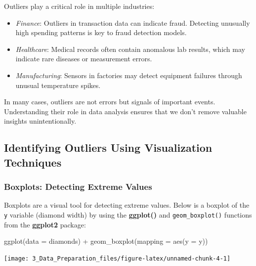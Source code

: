 \documentclass[
  11pt,
]{book}
\makeatletter
\newenvironment{Shaded}{}{}
\newcommand{\AttributeTok}[1]{#1}
\newcommand{\FunctionTok}[1]{#1}
\newcommand{\NormalTok}[1]{#1}
\newcommand{\SpecialCharTok}[1]{\textcolor[rgb]{0.39,0.39,0.39}{#1}}
\providecommand{\tightlist}{%
  \setlength{\itemsep}{0pt}\setlength{\parskip}{0pt}}
\newenvironment{kframe}{%
\medskip{}
\setlength{\fboxsep}{.8em}
 \def\at@end@of@kframe{}%
 \ifinner\ifhmode%
  \def\at@end@of@kframe{\end{minipage}}%
  \begin{minipage}{\columnwidth}%
 \fi\fi%
 \def\FrameCommand##1{\hskip\@totalleftmargin \hskip-\fboxsep
 \colorbox{shadecolor}{##1}\hskip-\fboxsep
     \hskip-\linewidth \hskip-\@totalleftmargin \hskip\columnwidth}%
 \MakeFramed {\advance\hsize-\width
   \@totalleftmargin\z@ \linewidth\hsize
   \@setminipage}}%
 {\par\unskip\endMakeFramed%
 \at@end@of@kframe}
\renewenvironment{Shaded}{\begin{kframe}}{\end{kframe}}
\theoremstyle{definition}
\theoremstyle{definition}
\theoremstyle{definition}
\theoremstyle{definition}
\theoremstyle{remark}
\makeatother
\begin{document}
Outliers play a critical role in multiple industries:

\begin{itemize}
\tightlist
\item
  \emph{Finance}: Outliers in transaction data can indicate fraud. Detecting unusually high spending patterns is key to fraud detection models.
\item
  \emph{Healthcare}: Medical records often contain anomalous lab results, which may indicate rare diseases or measurement errors.
\item
  \emph{Manufacturing}: Sensors in factories may detect equipment failures through unusual temperature spikes.
\end{itemize}

In many cases, outliers are not errors but signals of important events. Understanding their role in data analysis ensures that we don't remove valuable insights unintentionally.

\subsection*{Identifying Outliers Using Visualization Techniques}\label{identifying-outliers-using-visualization-techniques}


\subsubsection*{Boxplots: Detecting Extreme Values}\label{boxplots-detecting-extreme-values}


Boxplots are a visual tool for detecting extreme values. Below is a boxplot of the \texttt{y} variable (diamond width) by using the \textbf{ggplot()} and \texttt{geom\_boxplot()} functions from the \textbf{ggplot2} package:

\begin{Shaded}
\begin{Highlighting}[]
\FunctionTok{ggplot}\NormalTok{(}\AttributeTok{data =}\NormalTok{ diamonds) }\SpecialCharTok{+}
    \FunctionTok{geom\_boxplot}\NormalTok{(}\AttributeTok{mapping =} \FunctionTok{aes}\NormalTok{(}\AttributeTok{y =}\NormalTok{ y))}
\end{Highlighting}
\end{Shaded}

\begin{center}\texttt{[image: 3\_Data\_Preparation\_files/figure-latex/unnamed-chunk-4-1]} \end{center}
\end{document}

